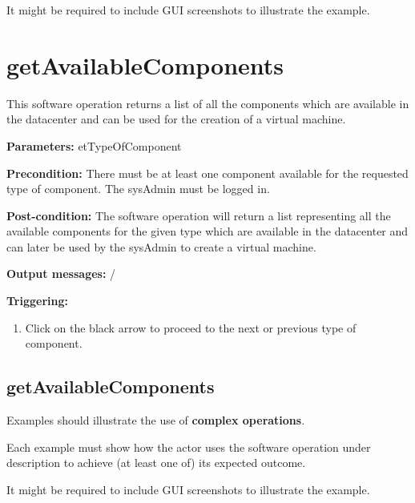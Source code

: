 It might be required to include GUI screenshots to illustrate the example.
















\section{getAvailableComponents}
\label{operation:getAvailableComponents}
This software operation returns a list of all the components which are available
in the datacenter and can be used for the creation of a virtual machine.
\begin{description}

\item \textbf{Parameters:} etTypeOfComponent
\item \textbf{Precondition:} There must be at least one component available for
the requested type of component. The sysAdmin must be logged in.
\item \textbf{Post-condition:} The software operation will return a list
representing all the available components for the given type which are available
in the datacenter and can later be used by the sysAdmin to create a virtual machine.

\item \textbf{Output messages:} /

\item \textbf{Triggering:}
\begin{enumerate}
\item Click on the black arrow to proceed to the next or previous type of
component.
\end{enumerate}

 
\end{description}

\subsection{getAvailableComponents}
Examples should illustrate the use of \textbf{complex operations}.

Each example must show how the actor uses the software operation under
description to achieve (at least one of) its expected outcome.

It might be required to include GUI screenshots to illustrate the example.















